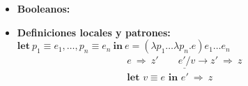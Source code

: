 \begin{itemize}
\begin{itemize}
\begin{multicols}{3}
              \[i'\neq 0\]
            \end{multicols}
          \end{itemize}
        \item \textbf{Booleanos:}
          \begin{itemize}
            \setlength{\columnsep}{.4cm}
          \end{itemize}
        \item \textbf{Definiciones locales y patrones:} $\textbf{let}\ p_1 \equiv e_1, \ldots, p_n \equiv e_n\ \textbf{in}\ e = (\lambda p_1\ldots\lambda p_n.e) e_1 \ldots e_n$
          \[\begin{array}{c}
            \underline{e\ \Rightarrow\  z' \qquad e'/v \to z'\ \Rightarrow\ z} \\
            \textbf{let } v \equiv e \textbf{ in } e' \ \Rightarrow\ z
            \end{array}\]
      \end{itemize}
    
